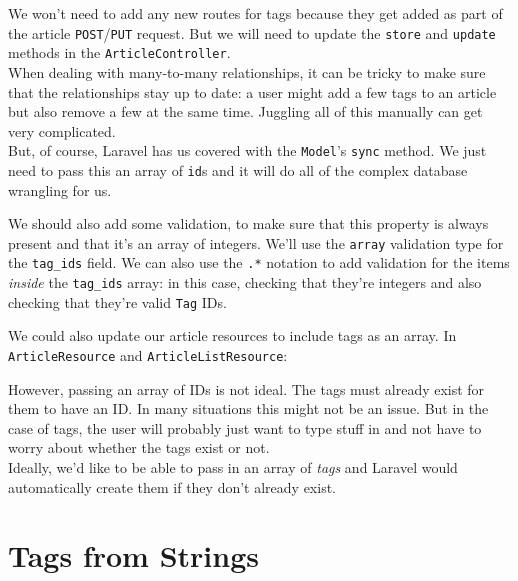 We won't need to add any new routes for tags because they get added as part of the article \texttt{POST}/\texttt{PUT} request. But we will need to update the \texttt{store} and \texttt{update} methods in the \texttt{ArticleController}.
\\

When dealing with many-to-many relationships, it can be tricky to make sure that the relationships stay up to date: a user might add a few tags to an article but also remove a few at the same time. Juggling all of this manually can get very complicated.
\\

But, of course, Laravel has us covered with the \texttt{Model}'s \texttt{sync} method. We just need to pass this an array of \texttt{id}s and it will do all of the complex database wrangling for us.


We should also add some validation, to make sure that this property is always present and that it's an array of integers. We'll use the \texttt{array} validation type for the \texttt{tag\_ids} field. We can also use the \texttt{.*} notation to add validation for the items \textit{inside} the \texttt{tag\_ids} array: in this case, checking that they're integers and also checking that they're valid \texttt{Tag} IDs.


We could also update our article resources to include tags as an array. In \texttt{ArticleResource} and \texttt{ArticleListResource}:


However, passing an array of IDs is not ideal. The tags must already exist for them to have an ID. In many situations this might not be an issue. But in the case of tags, the user will probably just want to type stuff in and not have to worry about whether the tags exist or not.
\\

Ideally, we'd like to be able to pass in an array of \textit{tags} and Laravel would automatically create them if they don't already exist.


\section{Tags from Strings}

